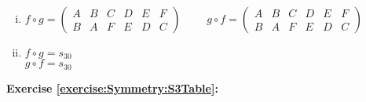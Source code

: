 \begin{enumerate}[(a)]
\begin{enumerate}[(i)]
	\item
	$f\circ g=\begin{pmatrix}
	A & B & C & D & E & F\\
	B & A & F & E & D & C
	\end{pmatrix}$
	$\qquad g\circ f=\begin{pmatrix}
	A & B & C & D & E & F\\
	B & A & F & E & D & C
	\end{pmatrix}$
	
	\item
	$f\circ g = s_{30}$\\
	$g\circ f = s_{30}$
	\end{enumerate}
\end{enumerate}

\noindent\textbf{Exercise \ref{exercise:Symmetry:S3Table}:}
